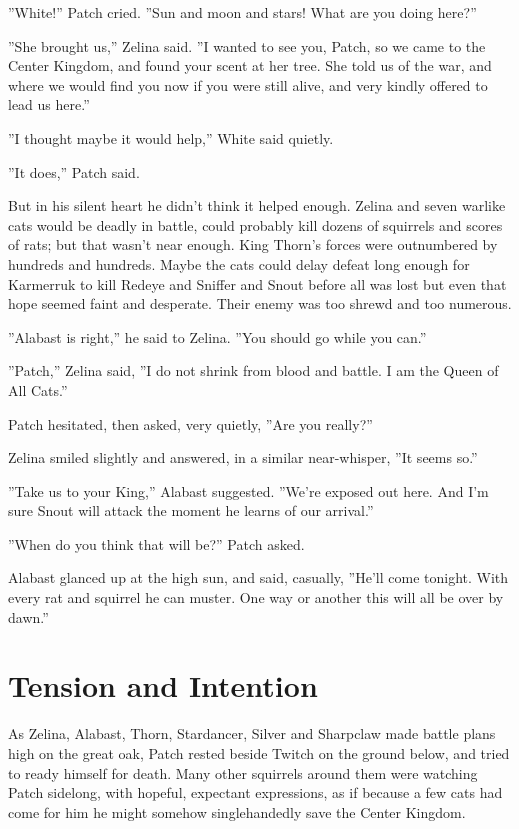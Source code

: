\documentclass[12pt]{book}
\begin{document}
''White!'' Patch cried. ''Sun and moon and stars! What are you doing here?''

''She brought us,'' Zelina said. ''I wanted to see you, Patch, so we came to the Center Kingdom, and found your scent at her tree. She told us of the war, and where we would find you now if you were still alive, and very kindly offered to lead us here.''

''I thought maybe it would help,'' White said quietly.

''It does,'' Patch said.

But in his silent heart he didn't think it helped enough. Zelina and seven warlike cats would be deadly in battle, could probably kill dozens of squirrels and scores of rats; but that wasn't near enough. King Thorn's forces were outnumbered by hundreds and hundreds. Maybe the cats could delay defeat long enough for Karmerruk to kill Redeye and Sniffer and Snout before all was lost %
but even that hope seemed faint and desperate. Their enemy was too shrewd and too numerous.

''Alabast is right,'' he said to Zelina. ''You should go while you can.''

''Patch,'' Zelina said, ''I do not shrink from blood and battle. I am the Queen of All Cats.''

Patch hesitated, then asked, very quietly, ''Are you really?''

Zelina smiled slightly and answered, in a similar near-whisper, ''It seems so.''

''Take us to your King,'' Alabast suggested. ''We're exposed out here. And I'm sure Snout will attack the moment he learns of our arrival.''

''When do you think that will be?'' Patch asked.

Alabast glanced up at the high sun, and said, casually, ''He'll come tonight. With every rat and squirrel he can muster. One way or another this will all be over by dawn.''


\section{Tension and Intention}

As Zelina, Alabast, Thorn, Stardancer, Silver and Sharpclaw made battle plans high on the great oak, Patch rested beside Twitch on the ground below, and tried to ready himself for death. Many other squirrels around them were watching Patch sidelong, with hopeful, expectant expressions, as if because a few cats had come for him he might somehow singlehandedly save the Center Kingdom.
\end{document}
